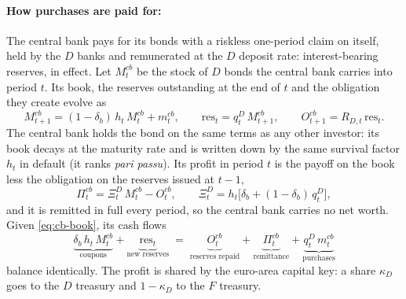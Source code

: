 \paragraph{How purchases are paid for:}
The central bank pays for its bonds with a riskless one-period claim on itself,
held by the $D$ banks and remunerated at the $D$ deposit rate: interest-bearing
reserves, in effect. Let $M^{cb}_t$ be the stock of $D$ bonds the central bank
carries into period $t$. Its book, the reserves outstanding at the end of $t$ and
the obligation they create evolve as
\begin{equation}
M^{cb}_{t+1}=(1-\delta_b)\,h_t\,M^{cb}_t+m^{cb}_t,
\qquad
\mathrm{res}_t=q^{D}_t\,M^{cb}_{t+1},
\qquad
O^{cb}_{t+1}=R_{D,t}\,\mathrm{res}_t .
\label{eq:cb-book}
\end{equation}
The central bank holds the bond on the same terms as any other investor: its
book decays at the maturity rate and is written down by the same survival factor
$h_t$ in default (it ranks \emph{pari passu}). Its profit in period $t$ is the
payoff on the book less the obligation on the reserves issued at $t-1$,
\begin{equation}
\Pi^{cb}_t=\Xi^{D}_t\,M^{cb}_t-O^{cb}_t,
\qquad
\Xi^{D}_t=h_t\bigl[\delta_b+(1-\delta_b)\,q^{D}_t\bigr],
\label{eq:cb-pl}
\end{equation}
and it is remitted in full every period, so the central bank carries no net
worth. Given \eqref{eq:cb-book}, its cash flows
\begin{equation*}
\underbrace{\delta_b\,h_t\,M^{cb}_t}_{\text{coupons}}
+\underbrace{\mathrm{res}_t}_{\text{new reserves}}
\;=\;
\underbrace{O^{cb}_t}_{\text{reserves repaid}}
+\underbrace{\Pi^{cb}_t}_{\text{remittance}}
+\underbrace{q^{D}_t\,m^{cb}_t}_{\text{purchases}}
\end{equation*}
balance identically. The profit is shared by the euro-area capital key: a share
$\kappa_D$ goes to the $D$ treasury and $1-\kappa_D$ to the $F$ treasury.

